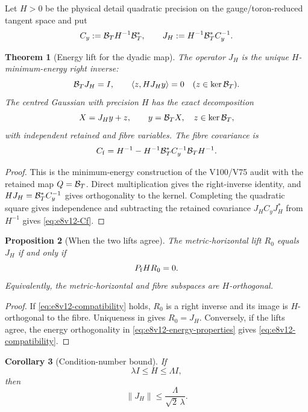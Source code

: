 \documentclass[11pt,oneside]{book}
\newtheorem{theorem}{Theorem}[chapter]
\newtheorem{proposition}[theorem]{Proposition}
\newtheorem{corollary}[theorem]{Corollary}
\theoremstyle{definition}
\theoremstyle{remark}
\begin{document}
Let \(H>0\) be the physical detail quadratic precision on the
gauge/toron-reduced tangent space and put
\[
 C_y:={\cal B}_TH^{-1}{\cal B}_T^*,\qquad
 J_H:=H^{-1}{\cal B}_T^*C_y^{-1}.                  \label{eq:e8v12-JH}
\]

\begin{theorem}[Energy lift for the dyadic map]
\label{thm:e8v12-energy-lift}
The operator \(J_H\) is the unique \(H\)-minimum-energy right inverse:
\[
 {\cal B}_TJ_H=I,\qquad
 \langle z,HJ_Hy\rangle=0\quad(z\in\ker{\cal B}_T). \label{eq:e8v12-energy-properties}
\]
The centred Gaussian with precision \(H\) has the exact decomposition
\[
 X=J_Hy+z,\qquad y={\cal B}_TX,\quad z\in\ker{\cal B}_T,             \label{eq:e8v12-Gaussian-split}
\]
with independent retained and fibre variables.  The fibre covariance
is
\[
 C_{\rm f}
 =H^{-1}-H^{-1}{\cal B}_T^*C_y^{-1}
             {\cal B}_TH^{-1}.                      \label{eq:e8v12-Cf}
\]
\end{theorem}

\begin{proof}
This is the minimum-energy construction of the V100/V75 audit with
the retained map \(Q={\cal B}_T\).  Direct multiplication gives the
right-inverse identity, and
\(HJ_H={\cal B}_T^*C_y^{-1}\) gives orthogonality to the kernel.
Completing the quadratic square gives independence and subtracting
the retained covariance \(J_HC_yJ_H^*\) from \(H^{-1}\) gives
\eqref{eq:e8v12-Cf}.
\end{proof}

\begin{proposition}[When the two lifts agree]
\label{prop:e8v12-lifts}
The metric-horizontal lift \(R_0\) equals \(J_H\) if and only if
\[
 P_{\rm f}HR_0=0.                                   \label{eq:e8v12-compatibility}
\]
Equivalently, the metric-horizontal and fibre subspaces are
\(H\)-orthogonal.
\end{proposition}

\begin{proof}
If \eqref{eq:e8v12-compatibility} holds, \(R_0\) is a right inverse
and its image is \(H\)-orthogonal to the fibre.  Uniqueness in
 gives \(R_0=J_H\).  Conversely, if the
lifts agree, the energy orthogonality in
\eqref{eq:e8v12-energy-properties} gives
\eqref{eq:e8v12-compatibility}.
\end{proof}

\begin{corollary}[Condition-number bound]
\label{cor:e8v12-JH-bound}
If
\[
 \lambda I\le H\le\Lambda I,                        \label{eq:e8v12-H-window}
\]
then
\[
 \|J_H\|\le\frac{\Lambda}{\sqrt2\,\lambda}.          \label{eq:e8v12-JH-bound}
\]
\end{corollary}
\end{document}
